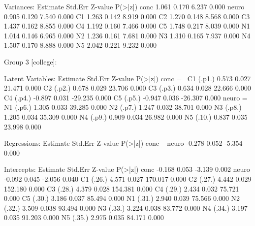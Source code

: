 \begin{Schunk}
\begin{Soutput}
Variances:
                   Estimate  Std.Err  Z-value  P(>|z|)
    conc              1.061    0.170    6.237    0.000
    neuro             0.905    0.120    7.540    0.000
    C1                1.263    0.142    8.919    0.000
    C2                1.270    0.148    8.568    0.000
    C3                1.437    0.162    8.855    0.000
    C4                1.192    0.160    7.466    0.000
    C5                1.748    0.217    8.039    0.000
    N1                1.014    0.146    6.965    0.000
    N2                1.236    0.161    7.681    0.000
    N3                1.310    0.165    7.937    0.000
    N4                1.507    0.170    8.888    0.000
    N5                2.042    0.221    9.232    0.000


Group 3 [college]:

Latent Variables:
                   Estimate  Std.Err  Z-value  P(>|z|)
  conc =~                                             
    C1      (.p1.)    0.573    0.027   21.471    0.000
    C2      (.p2.)    0.678    0.029   23.706    0.000
    C3      (.p3.)    0.634    0.028   22.666    0.000
    C4      (.p4.)   -0.897    0.031  -29.235    0.000
    C5      (.p5.)   -0.947    0.036  -26.307    0.000
  neuro =~                                            
    N1      (.p6.)    1.305    0.033   39.285    0.000
    N2      (.p7.)    1.247    0.032   38.701    0.000
    N3      (.p8.)    1.205    0.034   35.309    0.000
    N4      (.p9.)    0.909    0.034   26.982    0.000
    N5      (.10.)    0.837    0.035   23.998    0.000

Regressions:
                   Estimate  Std.Err  Z-value  P(>|z|)
  conc ~                                              
    neuro            -0.278    0.052   -5.354    0.000

Intercepts:
                   Estimate  Std.Err  Z-value  P(>|z|)
    conc             -0.168    0.053   -3.139    0.002
    neuro            -0.092    0.045   -2.056    0.040
    C1      (.26.)    4.571    0.027  170.017    0.000
    C2      (.27.)    4.442    0.029  152.180    0.000
    C3      (.28.)    4.379    0.028  154.381    0.000
    C4      (.29.)    2.434    0.032   75.721    0.000
    C5      (.30.)    3.186    0.037   85.494    0.000
    N1      (.31.)    2.940    0.039   75.566    0.000
    N2      (.32.)    3.509    0.038   93.494    0.000
    N3      (.33.)    3.224    0.038   83.772    0.000
    N4      (.34.)    3.197    0.035   91.203    0.000
    N5      (.35.)    2.975    0.035   84.171    0.000


\end{Soutput}
\end{Schunk}

